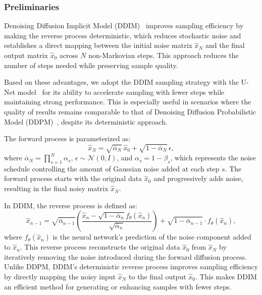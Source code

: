 
\subsubsection{Preliminaries}
\label{method21}

Denoising Diffusion Implicit Model (DDIM)~\citep{song2020denoising} improves sampling efficiency by making the reverse process deterministic, which reduces stochastic noise and establishes a direct mapping between the initial noise matrix \(\hat{x}_N\) and the final output matrix \(\hat{x}_0\) across $N$ non-Markovian steps. This approach reduces the number of steps needed while preserving sample quality. 

Based on these advantages, we adopt the DDIM sampling strategy with the U-Net model~\citep{ronneberger2015u} for its ability to accelerate sampling with fewer steps while maintaining strong performance. This is especially useful in scenarios where the quality of results remains comparable to that of Denoising Diffusion Probabilistic Model (DDPM)~\citep{ho2020denoising,nichol2021improved}, despite its deterministic approach.

The forward process is parameterized as:
\begin{equation}
\hat{x}_N = \sqrt{\bar{\alpha }_N} \, \hat{x}_0 + \sqrt{1 - \bar{\alpha }_N} \, \epsilon,
\end{equation}
where \(\bar{\alpha }_N = \prod_{s=1}^N \alpha_s\), \( \epsilon \sim \mathcal{N}(0, I)\), and \(\alpha_s = 1 - \beta_s\), which represents the noise schedule controlling the amount of Gaussian noise added at each step \(s\). The forward process starts with the original data \(\hat{x}_0\) and progressively adds noise, resulting in the final noisy matrix \(\hat{x}_N\).

In DDIM, the reverse process is defined as:
\begin{equation}
\hat{x}_{n-1} = \sqrt{\bar{\alpha }_{n-1}} \left( \frac{\hat{x}_{n} - \sqrt{1 - \bar{\alpha }_{n}} f_{\theta}\left(\hat{x}_{n}\right)}{\sqrt{\bar{\alpha }_{n}}} \right) + \sqrt{1 - \bar{\alpha }_{n-1}} \cdot f_{\theta}\left(\hat{x}_{n}\right),
\end{equation}
where \( f_{\theta}\left(\hat{x}_{n}\right) \) is the neural network's prediction of the noise component added to \( \hat{x}_n \). This reverse process reconstructs the original data \(\hat{x}_0\) from \(\hat{x}_N\) by iteratively removing the noise introduced during the forward diffusion process. Unlike DDPM, DDIM's deterministic reverse process improves sampling efficiency by directly mapping the noisy input \(\hat{x}_N\) to the final output \(\hat{x}_0\). This makes DDIM an efficient method for generating or enhancing samples with fewer steps.
